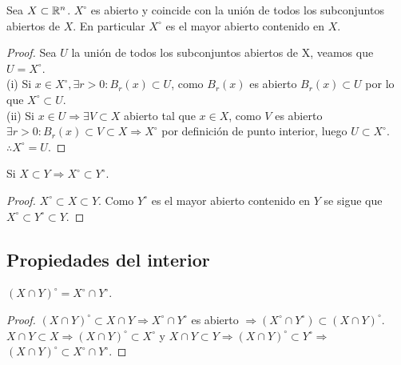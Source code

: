 \begin{prop}
  Sea \(X \subset \mathbb{R}^n\). \(X^{\circ} \) es abierto y coincide con la unión de todos los subconjuntos abiertos de \(X\). En particular \(X^{\circ} \) es el mayor abierto contenido en \(X\).
  \begin{proof}
    Sea \(U\) la unión de todos los subconjuntos abiertos de X, veamos que \(U = X^{\circ} \). \\
    (i) Si \(x \in X^{\circ}, \exists r > 0 : B_r(x) \subset U\), como \(B_r(x)\) es abierto \(B_r(x) \subset U\) por lo que \(X^{\circ} \subset U\). \\
    (ii) Si \(x \in U \Rightarrow \exists V \subset X\) abierto tal que \(x \in X\), como \(V\) es abierto \(\exists r > 0 : B_r(x) \subset V \subset X \Rightarrow X^{\circ} \) por definición de punto interior, luego \(U \subset X^{\circ} \). \\
    \(\therefore X^{\circ} = U\).
  \end{proof}
\end{prop}

\begin{corollary}
  Si \(X \subset Y \Rightarrow X^{\circ} \subset Y^{\circ} \).
  \begin{proof}
    \(X^{\circ} \subset X \subset Y\). Como \(Y^{\circ} \) es el mayor abierto contenido en \(Y\) se sigue que \(X^{\circ} \subset Y^{\circ} \subset Y\).
  \end{proof}
\end{corollary}

\subsection{Propiedades del interior}

\begin{prop}
  \({(X \cap Y)}^{\circ} = X^{\circ} \cap Y^{\circ} \).
  \begin{proof}
    \({(X \cap Y)}^{\circ} \subset X \cap Y \Rightarrow X^{\circ} \cap Y^{\circ} \) es abierto \(\Rightarrow (X^{\circ} \cap Y^{\circ}) \subset {(X \cap Y)}^{\circ} \). \\
    \(X \cap Y \subset X \Rightarrow {(X \cap Y)}^{\circ} \subset X^{\circ} \) y \(X \cap Y \subset Y \Rightarrow {(X \cap Y)}^{\circ} \subset Y^{\circ} \Rightarrow \) \\
    \({(X \cap Y)}^{\circ} \subset X^{\circ} \cap Y^{\circ} \).
  \end{proof}
\end{prop}

